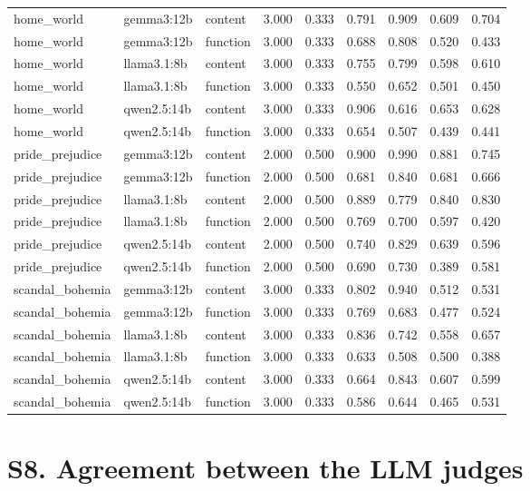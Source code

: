 \documentclass[10pt]{article}
\begin{document}
{\begin{longtable}{lllrrrrrr}
home\_world & gemma3:12b & content & 3.000 & 0.333 & 0.791 & 0.909 & 0.609 & 0.704 \\
home\_world & gemma3:12b & function & 3.000 & 0.333 & 0.688 & 0.808 & 0.520 & 0.433 \\
home\_world & llama3.1:8b & content & 3.000 & 0.333 & 0.755 & 0.799 & 0.598 & 0.610 \\
home\_world & llama3.1:8b & function & 3.000 & 0.333 & 0.550 & 0.652 & 0.501 & 0.450 \\
home\_world & qwen2.5:14b & content & 3.000 & 0.333 & 0.906 & 0.616 & 0.653 & 0.628 \\
home\_world & qwen2.5:14b & function & 3.000 & 0.333 & 0.654 & 0.507 & 0.439 & 0.441 \\
pride\_prejudice & gemma3:12b & content & 2.000 & 0.500 & 0.900 & 0.990 & 0.881 & 0.745 \\
pride\_prejudice & gemma3:12b & function & 2.000 & 0.500 & 0.681 & 0.840 & 0.681 & 0.666 \\
pride\_prejudice & llama3.1:8b & content & 2.000 & 0.500 & 0.889 & 0.779 & 0.840 & 0.830 \\
pride\_prejudice & llama3.1:8b & function & 2.000 & 0.500 & 0.769 & 0.700 & 0.597 & 0.420 \\
pride\_prejudice & qwen2.5:14b & content & 2.000 & 0.500 & 0.740 & 0.829 & 0.639 & 0.596 \\
pride\_prejudice & qwen2.5:14b & function & 2.000 & 0.500 & 0.690 & 0.730 & 0.389 & 0.581 \\
scandal\_bohemia & gemma3:12b & content & 3.000 & 0.333 & 0.802 & 0.940 & 0.512 & 0.531 \\
scandal\_bohemia & gemma3:12b & function & 3.000 & 0.333 & 0.769 & 0.683 & 0.477 & 0.524 \\
scandal\_bohemia & llama3.1:8b & content & 3.000 & 0.333 & 0.836 & 0.742 & 0.558 & 0.657 \\
scandal\_bohemia & llama3.1:8b & function & 3.000 & 0.333 & 0.633 & 0.508 & 0.500 & 0.388 \\
scandal\_bohemia & qwen2.5:14b & content & 3.000 & 0.333 & 0.664 & 0.843 & 0.607 & 0.599 \\
scandal\_bohemia & qwen2.5:14b & function & 3.000 & 0.333 & 0.586 & 0.644 & 0.465 & 0.531 \\
\bottomrule
\end{longtable}
}


\section*{S8. Agreement between the LLM judges}
\end{document}
